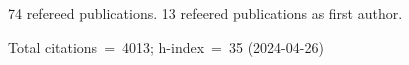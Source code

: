 74 refereed publications. 13 refeered publications as first author.

Total citations~=~4013; h-index~=~35 (2024-04-26)